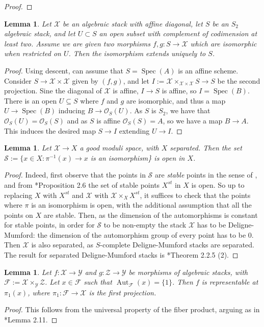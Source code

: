 \documentclass{amsart}
\newcommand{\cF}{\mathcal{F}}
\newcommand{\cO}{\mathcal{O}}
\newcommand{\cS}{\mathcal{S}}
\newcommand{\cX}{\mathcal{X}}
\newcommand{\cY}{\mathcal{Y}}
\newcommand{\cZ}{\mathcal{Z}}
\newcommand{\spec}{\operatorname{Spec}}
\newcommand{\Aut}{\operatorname{Aut}}
\newtheorem{Lemma}[theorem]{Lemma}
\theoremstyle{definition}
\theoremstyle{definition}
\begin{document}
{\begin{proof}
\end{proof}
\begin{Lemma}\label{lemma_two_maps_that_agree_in_codim_2_are_the_same}
    Let $\cX$ be an algebraic stack with affine diagonal, let $S$ be an $S_2$ algebraic stack, and let $U\subset S$ an open subset with complement of codimension at least two. Assume we are given two morphisms $f,g: S\to \cX$ which are isomorphic when restricted on $U$. Then the isomorphism extends uniquely to $S$.
\end{Lemma}
\begin{proof}
Using descent, can assume that $S=\spec(A)$ is an affine scheme.
    Consider $S\to \cX\times \cX$ given by $(f,g)$, and let $I:=\cX\times_{\cX\times \cX}S\to S$ be the second projection. Sine the diagonal of $\cX$ is affine, $I\to S$ is affine, so $I=\spec(B)$. There is an open $U\subseteq S$ where $f$ and $g$ are isomorphic, and thus a map $U\to\spec(B)$ inducing $B\to \cO_S(U)$. As $S$ is $S_2$, we have that $\cO_S(U)=\cO_S(S)$ and as $S$ is affine $\cO_S(S) = A$, so we have a map $B\to A$. This induces the desired map $S\to I$ extending $U\to I$.  
\end{proof}
\begin{Lemma}\label{lemma_locus_Where_gms_is_isom_is_open}
    Let $\cX\to X$ a good moduli space, with $X$ separated. Then the set $\cS:=\{x\in X:\pi^{-1}(x)\to x$ is an isomorphism\} is open in $X$.
\end{Lemma}
\begin{proof}
    Indeed, first observe that the points in $\cS$ are \textit{stable} points in the sense of \cite{ER21}, and from \cite{ER21}*{Proposition 2.6} the set of stable points $X^{st}$ in $X$ is open. So up to replacing $X$ with $X^{st}$ and $\cX$ with $\cX\times_{X}X^{st}$, it suffices to check that the points where $\pi$ is an isomorphism is open, with the additional assumption that all the points on $X$ are stable. Then, as the dimension of the automorphisms is constant for stable points, in order for $\cS$ to be non-empty the stack $\cX$ has to be Deligne-Mumford: the dimension of the automorphism group of every point has to be 0. Then $\cX$ is also separated, as $S$-complete Deligne-Mumford stacks are separated. The result for separated Deligne-Mumford stacks is \cite{conrad2007arithmetic}*{Theorem 2.2.5 (2)}. 
\end{proof}
\begin{Lemma}\label{lemma_rep_after_fiber_product}
    Let $f:\cX\to \cY$ and $g:\cZ\to \cY$ be morphisms of algebraic stacks, with $\cF:=\cX\times_\cY\cZ$. Let $x\in \cF$ such that $\Aut_{\cF}(x)=\{1\}$. Then $f$ is representable at $\pi_1(x)$, where $\pi_1:\cF\to \cX$ is the first projection.
\end{Lemma}
\begin{proof}
    This follows from the universal property of the fiber product, arguing as in \cite{Inc}*{Lemma 2.11}.
\end{proof}

}
\end{document}
